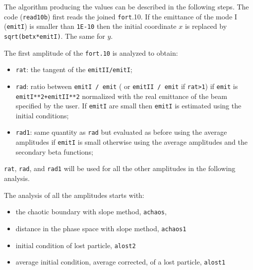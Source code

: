 \documentclass{article}    %
\begin{document}


The algorithm producing the values can be described in the following steps.
The code ({\tt read10b}) first reads the joined {\tt fort}.10.  If the
emittance of the mode I ({\tt emitI}) is smaller than {\tt 1E-10} then the
initial coordinate $x$ is replaced by {\tt sqrt(betx*emitI)}. The same for
$y$.


The first amplitude of the {\tt fort.10} is analyzed to obtain:
\begin{itemize}
\item {\tt rat}: the tangent of the {\tt emitII/emitI};
\item {\tt rad}: ratio between {\tt emitI / emit} (
or {\tt emitII / emit} if {\tt rat>1}) if {\tt emit} is {\tt
emitI**2+emitII**2} normalized with the real emittance of the beam specified
by the user.  If {\tt emitI} are small then {\tt emitI} is estimated using the
initial conditions;
\item {\tt rad1}: same quantity as {\tt rad} but evaluated as before using the
average amplitudes if {\tt emitI} is small otherwise using the average
amplitudes and the secondary beta functions;
\end{itemize}

{\tt rat}, {\tt rad}, and {\tt rad1} will be used for all the other amplitudes
in the following analysis.


The analysis of all the amplitudes starts with:
\begin{itemize}
\item the chaotic boundary with slope method, {\tt achaos},
\item distance in the phase space with slope method, {\tt achaos1}
\item initial condition of lost particle, {\tt alost2}
\item average initial condition, average corrected, of a lost particle,
  {\tt alost1}
\end{itemize}
\end{document}
